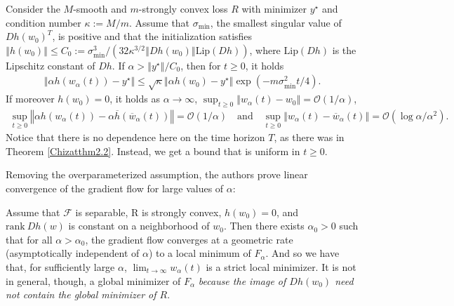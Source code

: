 \documentclass{article}
\newenvironment{manualtheorem}[1]{%
  \renewcommand\themanualtheoreminner{#1}%
  \manualtheoreminner
}{\endmanualtheoreminner}
\begin{document}
\begin{manualtheorem}{2.4}
Consider the $M$-smooth and $m$-strongly convex loss $R$ with minimizer $y^{\star}$ and condition number $\kappa := M/m$. Assume that $\sigma_{\text{min}}$, the smallest singular value of $Dh(w_0)^T$, is positive and that the initialization satisfies $\left\Vert h(w_0) \right\Vert \leq C_0:= \sigma_{\text{min}}^3/(32\kappa^{3/2} \left\Vert Dh(w_0) \right\Vert \text{Lip}(Dh))$, where $\text{Lip}(Dh)$ is the Lipschitz constant of $Dh$. If $\alpha > \left\Vert y^{\star} \right\Vert / C_0$, then for $t \geq 0$, it holds
\begin{align*}
    \left\Vert \alpha h(w_{\alpha}(t)) - y^{\star} \right\Vert \leq \sqrt{\kappa} \left\Vert \alpha h(w_0) - y^{\star} \right\Vert \exp( -m \sigma_{\text{min}}^2 t/4).
\end{align*}
If moreover $h(w_0) = 0$, it holds as $\alpha \rightarrow \infty$, $\sup_{t \geq 0} \left\Vert w_{\alpha}(t) - w_0 \right\Vert = \mathcal{O}(1/\alpha)$,
\begin{align*}
    \sup_{t \geq 0} \left\Vert \alpha h(w_{\alpha}(t)) - \alpha \overline{h}(\overline{w}_{\alpha}(t)) \right\Vert = \mathcal{O}(1/\alpha) \quad \text{and} \quad  \sup_{t \geq 0} \left\Vert w_{\alpha}(t) - \overline{w}_{\alpha}(t) \right\Vert = \mathcal{O}(\log \alpha/\alpha^2).
\end{align*}
\end{manualtheorem}
Notice that there is no dependence here on the time horizon $T$, as there was in Theorem \ref{Chizatthm2.2}. Instead, we get a bound that is uniform in $t \geq 0$.

Removing the overparameterized assumption, the authors prove linear convergence of the gradient flow for large values of $\alpha$:
\begin{manualtheorem}{2.5}
Assume that $\mathcal{F}$ is separable, R is strongly convex, $h(w_0) = 0$, and $\text{rank} \ Dh(w)$ is constant on a neighborhood of $w_0$. Then there exists ${\alpha_0} > 0$ such that for all $\alpha > \alpha_0$, the gradient flow converges at a geometric rate (asymptotically independent of $\alpha$) to a local minimum of $F_{\alpha}$.
\end{manualtheorem}
And so we have that, for sufficiently large $\alpha$, $\lim_{t \rightarrow \infty} w_{\alpha}(t)$ is a strict local minimizer. It is not in general, though, a global minimizer of $F_{\alpha}$ \textit{because the image of $Dh(w_0)$ need not contain the global minimizer of $R$}.
\end{document}
